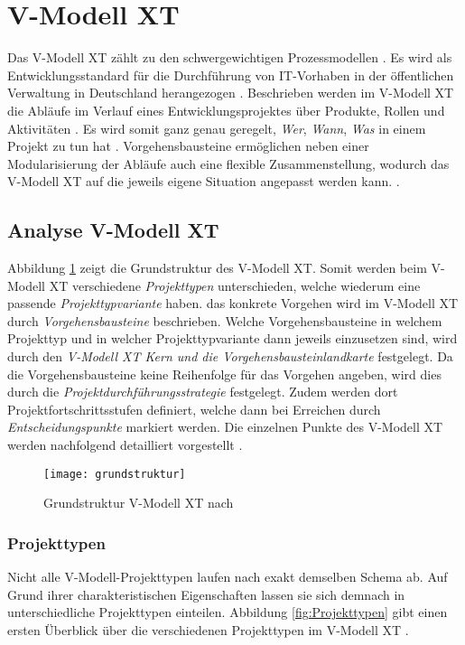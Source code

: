 \section{V-Modell XT}


Das V-Modell XT zählt zu den schwergewichtigen Prozessmodellen \cite{Hanser2010}. Es wird als Entwicklungsstandard für die Durchführung von IT-Vorhaben in der öffentlichen Verwaltung in Deutschland herangezogen \cite{Kuhrmann2011}. Beschrieben werden im V-Modell XT die Abläufe im Verlauf eines Entwicklungsprojektes über Produkte, Rollen und Aktivitäten \cite{Friedrich2008}. Es wird somit ganz genau geregelt, \textit{Wer}, \textit{Wann}, \textit{Was} in einem Projekt zu tun hat \cite{2004vmodell}. Vorgehensbausteine ermöglichen neben einer Modularisierung der Abläufe auch eine flexible Zusammenstellung, wodurch das V-Modell XT auf die jeweils eigene Situation angepasst werden kann. \cite{Friedrich2008,Zoerner2012}. \newline

\subsection{Analyse V-Modell XT}

Abbildung \ref{fig:grundstruktur} zeigt die Grundstruktur des V-Modell XT. Somit werden beim V-Modell XT verschiedene \textit{Projekttypen} unterschieden, welche wiederum eine passende \textit{Projekttypvariante} haben. das konkrete Vorgehen wird im V-Modell XT durch \textit{Vorgehensbausteine} beschrieben. Welche Vorgehensbausteine in welchem Projekttyp und in welcher Projekttypvariante dann jeweils einzusetzen sind, wird durch den \textit{V-Modell XT Kern und die Vorgehensbausteinlandkarte} festgelegt. Da die Vorgehensbausteine keine Reihenfolge für das Vorgehen angeben, wird dies durch die \textit{Projektdurchführungsstrategie} festgelegt. Zudem werden dort Projektfortschrittsstufen definiert, welche dann bei Erreichen durch \textit{Entscheidungspunkte} markiert werden. Die einzelnen Punkte des V-Modell XT werden nachfolgend detailliert vorgestellt \cite{2004vmodell}.
\begin{figure}[htp]
\begin{center}
  \texttt{[image: grundstruktur]} %
  \caption{Grundstruktur V-Modell XT nach \cite{2004vmodell}}
  \label{fig:grundstruktur}
\end{center}
\end{figure}

\subsubsection{Projekttypen}
Nicht alle V-Modell-Projekttypen laufen nach exakt demselben Schema ab. Auf Grund ihrer charakteristischen Eigenschaften lassen sie sich demnach in unterschiedliche Projekttypen einteilen. Abbildung \ref{fig:Projekttypen} gibt einen ersten Überblick über die verschiedenen Projekttypen im V-Modell XT \cite{2004vmodell}.

